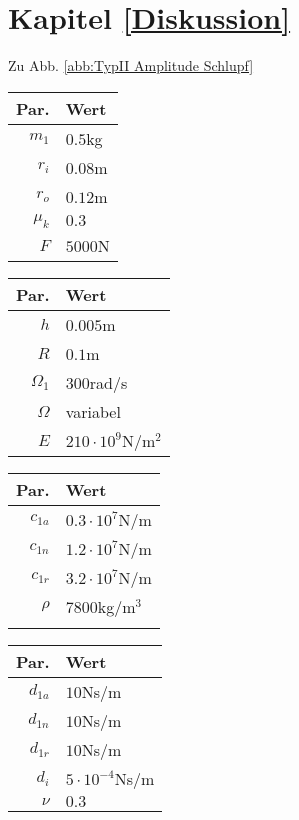 \section{Kapitel \ref{Diskussion}}
Zu Abb. \ref{abb:TypII Amplitude Schlupf}
\begin{center}
	\begin{tabular}{r|l}
		Par.&Wert\\\hline
		$m_1$&$0.5$kg\\
		$r_i$&$0.08$m\\
		$r_o$&$0.12$m\\
		$\mu_k$& $0.3$\\
		$F$&$5000$N\\
	\end{tabular}\hfill
	\begin{tabular}{r|l}
		Par.&Wert\\\hline
		$h$&$0.005$m\\
		$R$&$0.1$m\\
		$\Omega_1$&$300$rad/s\\
		$\Omega$& variabel \\
		$E$&$210\cdot10^9$N/m$^2$\\
	\end{tabular}\hfill
	\begin{tabular}{r|l}
		Par.&Wert\\\hline
		$c_{1a}$&$0.3\cdot10^{7}$N/m\\
		$c_{1n}$&$1.2\cdot10^{7}$N/m\\
		$c_{1r}$&$3.2\cdot10^{7}$N/m\\
		$\rho$&$7800$kg/m$^3$\\
		&
	\end{tabular}\hfill
	\begin{tabular}{r|l}
		Par.&Wert\\\hline
		$d_{1a}$&$10$Ns/m\\
		$d_{1n}$&$10$Ns/m\\
		$d_{1r}$&$10$Ns/m\\
		$d_i$ &$5\cdot10^{-4}$Ns/m\\
		$\nu$&$0.3$\\
	\end{tabular}
\end{center}

